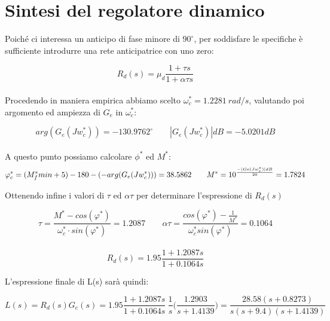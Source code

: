 \documentclass[a4paper,12pt,italian]{article}
\begin{document}
\section*{Sintesi del regolatore dinamico}

Poiché ci interessa un anticipo di fase minore di $90^\circ$, 
per soddisfare le specifiche è sufficiente introdurre una rete anticipatrice con uno zero:

\begin{equation*}
    R_d(s)= \mu_d \frac{1+\tau s} { 1 + \alpha \tau s} 
\end{equation*}\\
Procedendo in maniera empirica abbiamo scelto $\omega_c^* = 1.2281~rad/s$, 
valutando poi argomento ed ampiezza di $G_e$ in $\omega_c^*$:

\begin{equation*}
        arg(G_e(J w^*_c))= -130.9762^\circ
        \hspace{2em}|G_e(J w^*_c)|dB = -5.0201 dB
\end{equation*}\\
A questo punto possiamo calcolare $\phi^*$ ed $M^*$:
\begin{equation*}
    \varphi^*_c=(M^*_fmin +5)-180-(\space-arg(G_e(J w^*_c))\space)=38.5862
    \hspace{2em}
    M^*=10^\frac{-|Ge(Jw_c^*)|dB}{20}=1.7824
\end{equation*}

Ottenendo infine i valori di $\tau$ ed $\alpha \tau$ per determinare l'espressione di $R_d(s)$

\begin{equation*}
    \tau = \frac{M^*-cos(\varphi^*)}{\omega^*_c\cdot sin(\varphi^*)}
         = 1.2087
    \hspace{2em}
    \alpha \tau = \frac{cos(\varphi^*)-\frac{1}{M^*}}{\omega_c^*sin(\varphi^*)}
                = 0.1064
\end{equation*}\\
\begin{equation*}
    R_d(s) = 1.95\frac{1+1.2087s}{1+0.1064s}
\end{equation*}

L'espressione finale di L(s) sarà quindi:

\begin{equation*}
    L(s) = R_d(s) G_e(s) = 
    1.95
    \frac{1+1.2087s}{1+0.1064s}~
    \frac {1} {s}
    \bigg(\frac { 1.2903 }{s+1.4139}\bigg)
    = \frac{28.58(s+0.8273)}{s(s+9.4)(s+1.4139)}
\end{equation*}
\end{document}
